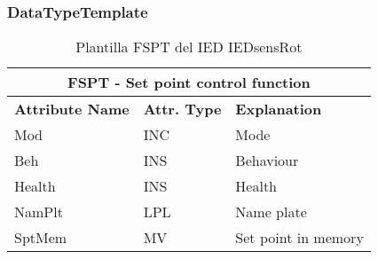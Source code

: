     \subsubsection{DataTypeTemplate}
    \begin{table}[H]
    \begin{center}
    \begin{tabular}{|l|l|p{8.5cm}|}
            \hline
            \multicolumn{3}{|c|}{\cellcolor[gray]{0.8} \textbf{ FSPT}  - Set point control function} \\
            \hline
            \textbf{Attribute Name} & \textbf{Attr. Type} & \textbf{Explanation} \\
            \hline 
            Mod & INC & Mode \\
            \hline
            Beh & INS & Behaviour \\
            \hline
            Health & INS & Health \\
            \hline
            NamPlt & LPL & Name plate \\
            \hline
            SptMem & MV & Set point in memory \\
            \hline
    \end{tabular}
    \caption{Plantilla FSPT del IED IEDsensRot}
    \label{table:lnTypeFSPT_1}
    \end{center}
    \end{table}
    
    
    